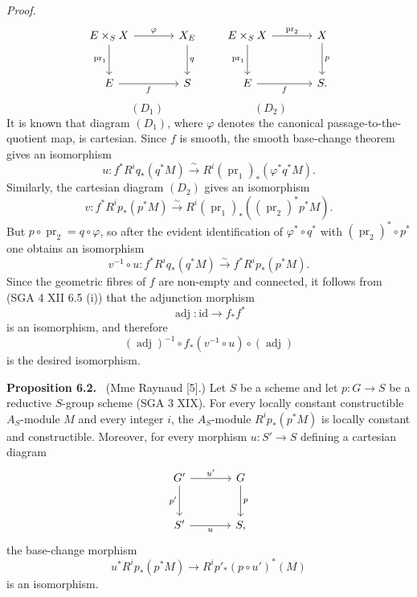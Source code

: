 \documentclass[11pt]{article}
\newenvironment{statement}[1]{\par\medskip\noindent\textbf{#1.}\ }{\par\medskip}
\providecommand{\pr}{\operatorname{pr}}
\providecommand{\pr}{\operatorname{pr}}
\begin{document}
\emph{Proof.}
\[
\begin{tikzcd}[column sep=large,row sep=large]
E\times_S X \arrow[r,"\varphi"] \arrow[d,"\pr_1"'] & X_E \arrow[d,"q"]\\
E \arrow[r,"f"'] & S
\end{tikzcd}
\qquad
\begin{tikzcd}[column sep=large,row sep=large]
E\times_S X \arrow[r,"\pr_2"] \arrow[d,"\pr_1"'] & X \arrow[d,"p"]\\
E \arrow[r,"f"'] & S .
\end{tikzcd}
\]
\[
(D_1)\qquad\qquad\qquad\qquad(D_2)
\]
It is known that diagram $(D_1)$, where $\varphi$ denotes the canonical passage-to-the-quotient map, is cartesian. Since $f$ is smooth, the smooth base-change theorem gives an isomorphism
\[
u:f^*R^iq_*(q^*M)\xrightarrow{\sim}R^i(\pr_1)_*(\varphi^*q^*M).
\]
Similarly, the cartesian diagram $(D_2)$ gives an isomorphism
\[
v:f^*R^ip_*(p^*M)\xrightarrow{\sim}R^i(\pr_1)_*((\pr_2)^*p^*M).
\]
But $p\circ\pr_2=q\circ\varphi$, so after the evident identification of $\varphi^*\circ q^*$ with $(\pr_2)^*\circ p^*$ one obtains an isomorphism
\[
v^{-1}\circ u:f^*R^iq_*(q^*M)\xrightarrow{\sim} f^*R^ip_*(p^*M).
\]
Since the geometric fibres of $f$ are non-empty and connected, it follows from (SGA 4 XII 6.5 (i)) that the adjunction morphism
\[
\operatorname{adj}:\mathrm{id}\to f_*f^*
\]
is an isomorphism, and therefore
\[
(\operatorname{adj})^{-1}\circ f_*(v^{-1}\circ u)\circ(\operatorname{adj})
\]
is the desired isomorphism.

\begin{statement}{Proposition 6.2}
(Mme Raynaud [5].) Let $S$ be a scheme and let $p:G\to S$ be a reductive $S$-group scheme (SGA 3 XIX). For every locally constant constructible $A_S$-module $M$ and every integer $i$, the $A_S$-module $R^ip_*(p^*M)$ is locally constant and constructible. Moreover, for every morphism $u:S'\to S$ defining a cartesian diagram
\[
\begin{tikzcd}[column sep=large,row sep=large]
G' \arrow[r,"u'"] \arrow[d,"p'"'] & G \arrow[d,"p"]\\
S' \arrow[r,"u"'] & S,
\end{tikzcd}
\]
the base-change morphism
\[
u^*R^ip_*(p^*M)\to R^ip'_*(p\circ u')^*(M)
\]
is an isomorphism.
\end{statement}
\end{document}
